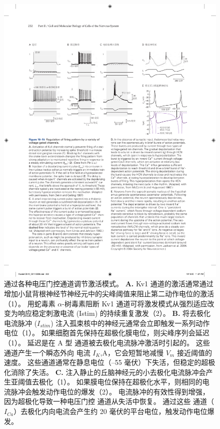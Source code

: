 \begin{figure}[htbp]
	\centering
	\includegraphics[width=1.0\linewidth]{chap10/fig_10_15}
	\caption{通过各种电压门控通道调节激活模式。
		\textbf{A.} Kv1 通道的激活通常通过增加小鼠背根神经节神经元中的尖峰阈值来阻止第二动作电位的激活（1）。
		用蛇毒素 $\alpha$-树毒素阻断 Kv1 通道可将激发模式从强烈适应改变为响应稳定刺激电流 (Istim) 的持续重复激发（2）。
		\textbf{B.} 将去极化电流脉冲 ($I_{stim}$) 注入孤束核中的神经元通常会立即触发一系列动作电位（1）。
		如果细胞首先保持在超极化膜电位，则尖峰序列会延迟（1）。
		延迟是在 A 型  通道被去极化电流脉冲激活时引起的。
		这些通道产生一个瞬态外向  电流 $I_K$,A，它会短暂地减慢 $V_m$ 接近阈值的速度。
		这些通道通常在静息电位（–55 毫伏）下失活，但稳定的超极化消除了失活\cite{dekin1987vitro}。
		\textbf{C.} 注入静止的丘脑神经元的小去极化电流脉冲会产生亚阈值去极化（1）。
		如果膜电位保持在超极化水平，则相同的电流脉冲会触发动作电位的爆发（2）。
		电流脉冲的有效性得到增强，因为超极化导致一种电压门控  通道从失活中恢复。
		通过这些  通道（$I_{Ca}$）去极化内向电流会产生约 20 毫伏的平台电位，触发动作电位爆发。
}
\end{figure}
